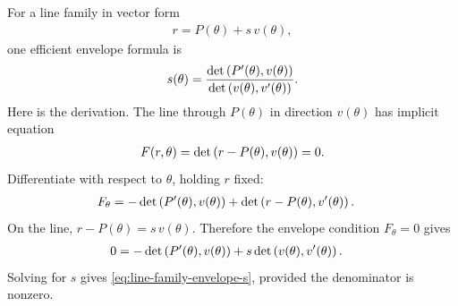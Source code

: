 \documentclass[11pt]{article}
\begin{document}
For a line family in vector form
\begin{align}
  r=P(\theta)+s\,v(\theta),
\end{align}
one efficient envelope formula is
\begin{align}
  s(\theta)
  =
  \frac{\det\left( P'(\theta),v(\theta) \right)}
       {\det\left( v(\theta),v'(\theta) \right)}.
  \label{eq:line-family-envelope-s}
\end{align}
Here is the derivation. The line through \(P(\theta)\) in direction \(v(\theta)\) has implicit equation
\begin{align}
  F(r,\theta)=\det\left( r-P(\theta),v(\theta) \right)=0.
\end{align}
Differentiate with respect to \(\theta\), holding \(r\) fixed:
\begin{align}
  F_\theta
    &=
    -\det\left( P'(\theta),v(\theta) \right)
    +
    \det\left( r-P(\theta),v'(\theta) \right).
\end{align}
On the line, \(r-P(\theta)=s\,v(\theta)\). Therefore the envelope condition \(F_\theta=0\) gives
\begin{align}
  0
    &=
    -\det\left( P'(\theta),v(\theta) \right)
    +
    s\det\left( v(\theta),v'(\theta) \right).
\end{align}
Solving for \(s\) gives \cref{eq:line-family-envelope-s}, provided the denominator is nonzero.
\end{document}
